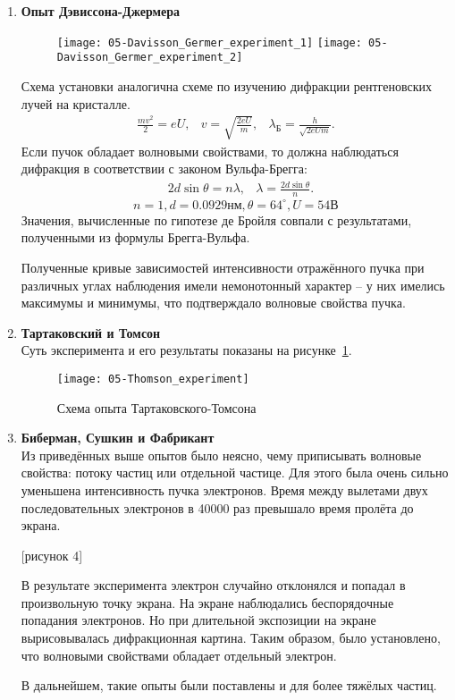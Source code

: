 \begin{enumerate}
    \item \textbf{Опыт Дэвиссона-Джермера}\\
    \begin{figure}[h!]
        \center
        \texttt{[image: 05-Davisson\_Germer\_experiment\_1]}
        \hfill
        \texttt{[image: 05-Davisson\_Germer\_experiment\_2]}
    \end{figure}
    Схема установки аналогична схеме по изучению дифракции рентгеновских лучей
    на кристалле.
    \begin{align*}
        \frac{mv^2}{2} = eU, & v = \sqrt{\frac{2eU}{m}},
        & \lambda_\text{Б} = \frac{h}{\sqrt{2eUm}}.
    \end{align*}
    Если пучок обладает волновыми свойствами, то должна наблюдаться дифракция в
    соответствии с законом Вульфа-Брегга:
    \begin{align*}
        & 2d\sin\theta = n\lambda,
        & \lambda = \frac{2d\sin\theta}{n}.
    \end{align*}
    \[
        n = 1, d = 0.0929 нм,  \theta = 64^\circ, U = 54 В
    \]
    Значения, вычисленные по гипотезе де Бройля совпали с результатами, полученными
    из формулы Брегга-Вульфа.

    Полученные кривые зависимостей интенсивности отражённого пучка при различных
    углах наблюдения имели немонотонный характер -- у них имелись максимумы и
    минимумы, что подтверждало волновые свойства пучка.

    \item \textbf{Тартаковский и Томсон}\\
    Суть эксперимента и его результаты показаны на рисунке~\ref{fig:05-Thomson_experiment}.
    \begin{figure}[h!]
        \center
        \texttt{[image: 05-Thomson\_experiment]}
        \caption{Схема опыта Тартаковского-Томсона}
        \label{fig:05-Thomson_experiment}
    \end{figure}

    \item \textbf{Биберман, Сушкин и Фабрикант}\\
    Из приведённых выше опытов было неясно, чему приписывать волновые свойства:
    потоку частиц или отдельной частице. Для этого была очень сильно уменьшена
    интенсивность пучка электронов. Время между вылетами двух последовательных
    электронов в 40000 раз превышало время пролёта до экрана.

    [рисунок 4]

    В результате эксперимента электрон случайно отклонялся и попадал в произвольную
    точку экрана. На экране наблюдались беспорядочные попадания электронов. Но при
    длительной экспозиции на экране вырисовывалась дифракционная картина.
    Таким образом, было установлено, что волновыми свойствами обладает отдельный
    электрон.

    В дальнейшем, такие опыты были поставлены и для более тяжёлых частиц.
\end{enumerate}


